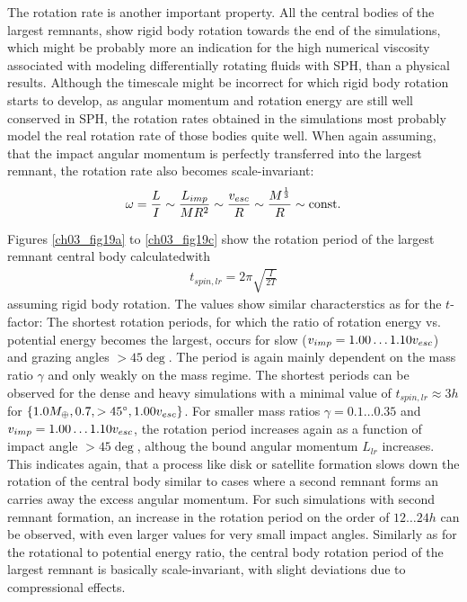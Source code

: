The rotation rate is another important property. All the central bodies of the largest remnants, show rigid body rotation towards the end of the simulations, which might be probably more an indication for the high numerical viscosity associated with modeling differentially rotating fluids with SPH, than a physical results. Although the timescale might be incorrect for which rigid body rotation starts to develop, as angular momentum and rotation energy are still well conserved in SPH, the rotation rates obtained in the simulations most probably model the real rotation rate of those bodies quite well. When again assuming, that the impact angular momentum is perfectly transferred into the largest remnant, the rotation rate also becomes scale-invariant:
\begin{align}
\omega = \frac{L}{I} \sim \frac{L_{imp}}{M R^2} \sim \frac{v_{esc}}{R} \sim \frac{M^{\frac{1}{3}}}{R} \sim \mathrm{const.}
\end{align} 

Figures \ref{ch03_fig19a} to \ref{ch03_fig19c} show the rotation period of the largest remnant central body calculatedwith 
\begin{align}
t_{spin, lr} = 2 \pi \sqrt{ \frac{I}{2 T} }
\end{align}
assuming rigid body rotation. The values show similar characterstics as for the $t$-factor: The shortest rotation periods, for which the ratio of rotation energy vs. potential energy becomes the largest, occurs for slow ($v_{imp} = 1.00 \dots 1.10 v_{esc}$) and grazing angles $> 45 \deg$. The period is again mainly dependent on the mass ratio $\gamma$ and only weakly on the mass regime. The shortest periods can be observed for the dense and heavy \css simulations with a minimal value of $t_{spin, lr} \approx 3h$ for $\{1.0 M_{\oplus}, 0.7, > 45 ^\circ, 1.00 v_{esc} \}$. For smaller mass ratios $\gamma = 0.1 \dots 0.35$ and $v_{imp} = 1.00 \dots 1.10 v_{esc}$, the rotation period increases again as a function of impact angle $> 45 \deg$, althoug the bound angular momentum $L_{lr}$ increases. This indicates again, that a process like disk or satellite formation slows down the rotation of the central body similar to cases where a second remnant forms an carries away the excess angular momentum. For such simulations with second remnant formation, an increase in the rotation period on the order of $12 \dots 24h$ can be observed, with even larger values for very small impact angles. Similarly as for the rotational to potential energy ratio, the central body rotation period of the largest remnant is basically scale-invariant, with slight deviations due to compressional effects.

